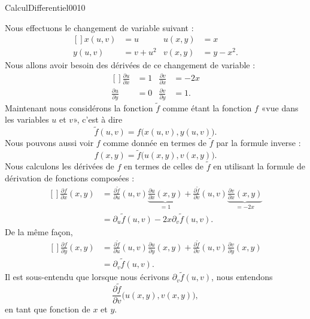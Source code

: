 \begin{corrige}{CalculDifferentiel0010}

	Nous effectuons le changement de variable suivant :
	\begin{equation}
		\begin{aligned}[]
			x(u,v)&=u&u(x,y)&=x\\
			y(u,v)&=v+u^2&v(x,y)&=y-x^2.
		\end{aligned}
	\end{equation}
	Nous allons avoir besoin des dérivées de ce changement de variable :
	\begin{equation}
		\begin{aligned}[]
			\frac{ \partial u }{ \partial x }&=1&\frac{ \partial v }{ \partial x }&=-2x\\
			\frac{ \partial u }{ \partial y }&=0&\frac{ \partial v }{ \partial y }&=1.
		\end{aligned}
	\end{equation}
	Maintenant nous considérons la fonction $\tilde f$ comme étant la fonction $f$ «vue dans les variables $u$ et $v$», c'est à dire
	\begin{equation}
		\tilde f(u,v)=f\big( x(u,v),y(u,v) \big).
	\end{equation}
	Nous pouvons aussi voir $f$ comme donnée en termes de $\tilde f$ par la formule inverse :
	\begin{equation}
		f(x,y)=\tilde f\big( u(x,y),v(x,y) \big).
	\end{equation}
	Nous calculons les dérivées de $f$ en termes de celles de $\tilde f$ en utilisant la formule de dérivation de fonctions composées :
	\begin{equation}
		\begin{aligned}[]
			\frac{ \partial f }{ \partial x }(x,y)&=\frac{ \partial \tilde f }{ \partial u }(u,v)\underbrace{\frac{ \partial u }{ \partial x }(x,y)}_{=1}+\frac{ \partial \tilde f }{ \partial v }(u,v)\underbrace{\frac{ \partial v }{ \partial x }(x,y)}_{=-2x}\\
			&=\partial_u\tilde f(u,v)-2x\partial_v\tilde f(u,v).
		\end{aligned}
	\end{equation}
	De la même façon,
	\begin{equation}
		\begin{aligned}[]
			\frac{ \partial f }{ \partial y }(x,y)&=\frac{ \partial \tilde f }{ \partial u }(u,v)\frac{ \partial u }{ \partial y }(x,y)+\frac{ \partial \tilde f }{ \partial v }(u,v)\frac{ \partial v }{ \partial y }(x,y)\\
			&=\partial_v\tilde f(u,v).
		\end{aligned}
	\end{equation}
	Il est sous-entendu que lorsque nous écrivons $\partial_v\tilde f(u,v)$, nous entendons
	\begin{equation}
		\frac{ \partial \tilde f }{ \partial v }\big( u(x,y),v(x,y) \big),
	\end{equation}
	en tant que fonction de $x$ et $y$.


\end{corrige}
